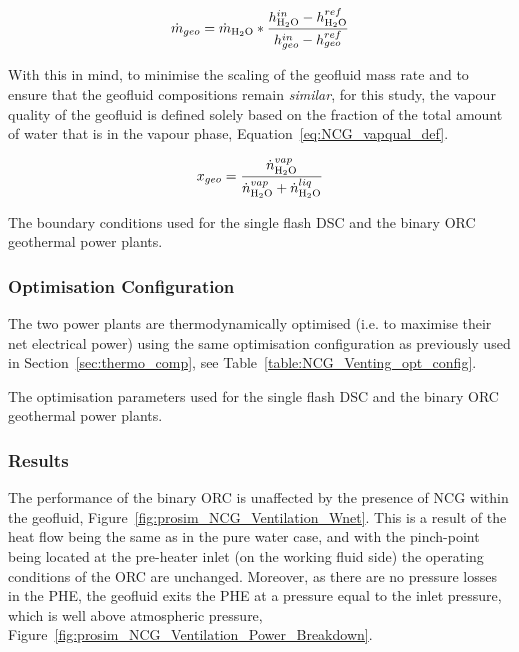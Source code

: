         \begin{align}
            \Dot{m}_{geo} = \Dot{m}_{\ce{H2O}} * \frac{h_{\ce{H2O}}^{in}-h_{\ce{H2O}}^{ref}}{h_{geo}^{in}-h_{geo}^{ref}} \label{eq:NCG_mrate_scaling}
        \end{align}

        With this in mind, to minimise the scaling of the geofluid mass rate and to ensure that the geofluid compositions remain \emph{similar}, for this study, the vapour quality of the geofluid is defined solely based on the fraction of the total amount of water that is in the vapour phase, Equation~\ref{eq:NCG_vapqual_def}.

        \begin{align}
            x_{geo} = \frac{\Dot{n}_{\ce{H2O}}^{vap}}{\Dot{n}_{\ce{H2O}}^{vap}+\Dot{n}_{\ce{H2O}}^{liq}} \label{eq:NCG_vapqual_def}
        \end{align}

        \begin{table}[H]
            \centering
            \caption{The boundary conditions used for the single flash \ac{DSC} and the binary \ac{ORC} geothermal power plants.}
            \label{table:NCG_Venting_BCs}
                    
        \end{table}
    
    \subsubsection{Optimisation Configuration}
        \label{sec:NCG_Venting_opt_config}
        The two power plants are thermodynamically optimised (i.e. to maximise their net electrical power) using the same optimisation configuration as previously used in Section~\ref{sec:thermo_comp}, see Table~\ref{table:NCG_Venting_opt_config}.

        \begin{table}[H]
            \centering
            \caption{The optimisation parameters used for the single flash \ac{DSC} and the binary \ac{ORC} geothermal power plants.}
            \label{table:NCG_Venting_opt_config}
                    
        \end{table}

    \subsubsection{Results}
        The performance of the binary \ac{ORC} is unaffected by the presence of \ac{NCG} within the geofluid, Figure~\ref{fig:prosim_NCG_Ventilation_Wnet}. This is a result of the heat flow being the same as in the pure water case, and with the pinch-point being located at the pre-heater inlet (on the working fluid side) the operating conditions of the \ac{ORC} are unchanged. Moreover, as there are no pressure losses in the \ac{PHE}, the geofluid exits the \ac{PHE} at a pressure equal to the inlet pressure, which is well above atmospheric pressure, Figure~\ref{fig:prosim_NCG_Ventilation_Power_Breakdown}.

